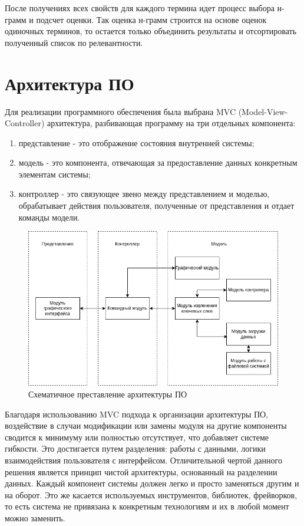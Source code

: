 После получениях всех свойств для каждого термина идет процесс выбора н-грамм и подсчет оценки.
Так оценка н-грамм строится на основе оценок одиночных терминов, то остается только объединить результаты и отсортировать полученный список по релевантности.


\section{Архитектура ПО}
Для реализации программного обеспечения была выбрана MVC (Model-View-Controller) архитектура, разбивающая программу на три отдельных компонента:
\begin{enumerate}
	\item представление - это отображение состояния внутренней системы;
	\item модель - это компонента, отвечающая за предоставление данных конкретным элементам системы;
	\item контроллер - это связующее звено между представлением и моделью, обрабатывает действия пользователя, полученные от представления и отдает команды модели.
\end{enumerate}
\begin{figure}[!h]
	\centering
	\includegraphics[width=1\linewidth]{src/img/design/mvc.drawio}
	\caption{Схематичное преставление архитектуры ПО}
	\label{fig:mvc}
\end{figure}

Благодаря использованию MVC подхода к организации архитектуры ПО, воздействие в случаи модификации или замены модуля на другие компоненты сводится к минимуму или полностью отсутствует, что добавляет системе гибкости.
Это достигается путем разделения: работы с данными, логики взаимодействия пользователя с интерфейсом.
Отличительной чертой данного решения является принцип чистой архитектуры, основанный на разделении данных.
Каждый компонент системы должен легко и просто заменяться другим и на оборот.
Это же касается используемых инструментов, библиотек, фрейворков, то есть система не привязана к конкретным технологиям и их в любой момент можно заменить.

